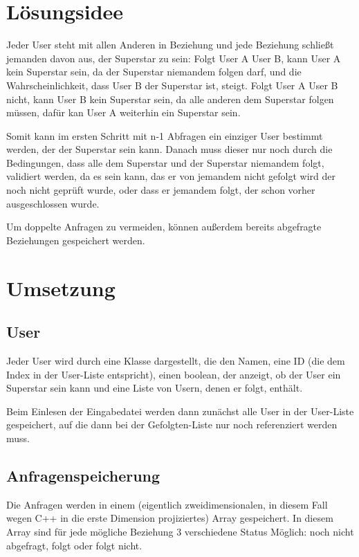 \documentclass[a4paper,10pt,ngerman]{scrartcl}
\title{\Aufgabe}
\author{\Name\\Team-ID: \TeamId}
\date{\today}
\begin{document}
\maketitle
\tableofcontents

\section{Lösungsidee}
Jeder User steht mit allen Anderen in Beziehung und jede Beziehung schließt jemanden davon aus, der Superstar zu sein: Folgt User A User B, kann User A kein Superstar sein, da der Superstar niemandem folgen darf, und die Wahrscheinlichkeit, dass User B der Superstar ist, steigt. Folgt User A User B nicht, kann User B kein Superstar sein, da alle anderen dem Superstar folgen müssen, dafür kan User A weiterhin ein Superstar sein.

Somit kann im ersten Schritt mit n-1 Abfragen ein einziger User bestimmt werden, der der Superstar sein kann. Danach muss dieser nur noch durch die Bedingungen, dass alle dem Superstar und der Superstar niemandem folgt, validiert werden, da es sein kann, das er von jemandem nicht gefolgt wird der noch nicht geprüft wurde, oder dass er jemandem folgt, der schon vorher ausgeschlossen wurde.

Um doppelte Anfragen zu vermeiden, können außerdem bereits abgefragte Beziehungen gespeichert werden.


\section{Umsetzung}

\subsection{User}
Jeder User wird durch eine Klasse dargestellt, die den Namen, eine ID (die dem Index in der User-Liste entspricht), einen boolean, der anzeigt, ob der User ein Superstar sein kann und eine Liste von Usern, denen er folgt, enthält.

Beim Einlesen der Eingabedatei werden dann zunächst alle User in der User-Liste gespeichert, auf die dann bei der Gefolgten-Liste nur noch referenziert werden muss.

\subsection{Anfragenspeicherung}
Die Anfragen werden in einem (eigentlich zweidimensionalen, in diesem Fall wegen C++ in die erste Dimension projiziertes) Array gespeichert. In diesem Array sind für jede mögliche Beziehung 3 verschiedene Status Möglich: noch nicht abgefragt, folgt oder folgt nicht.
\end{document}
